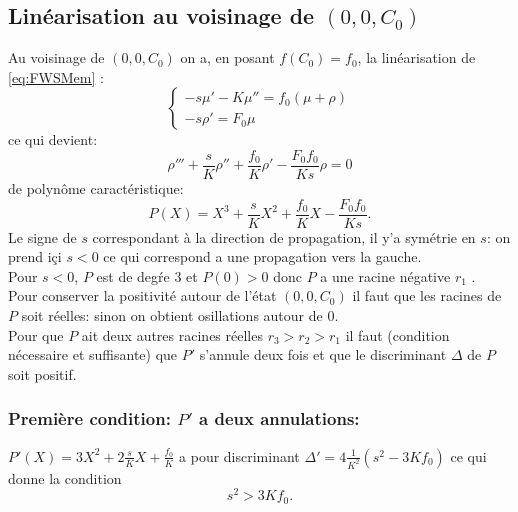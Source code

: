 \documentclass[11pt]{article}
\begin{document}
\subsection{Linéarisation au voisinage de $(0,0,C_0)$}
Au voisinage de $(0,0,C_0)$ on a, en posant $f(C_0)=f_0$, la linéarisation de \ref{eq:FWSMem} :
\begin{equation} \left\{ \begin{array}{ll} -s \mu'-K\mu''=f_0(\mu+\rho) \\ -s\rho' = F_0\mu   \end{array}\right.
\end{equation} ce qui devient:  \begin{equation} \rho''' +\frac{s}{K}\rho''+\frac{f_0}{K}\rho'-\frac{F_0f_0}{Ks}\rho =0 \end{equation} de polynôme caractéristique: \begin{equation} P(X)= X^3 +\frac{s}{K}X^2+\frac{f_0}{K}X-\frac{F_0f_0}{Ks}.\end{equation}
Le signe de $s$ correspondant à la direction de propagation, il y'a symétrie en $s$: on prend içi $s<0$ ce qui correspond a une propagation vers la gauche.\\
Pour $s<0$, $P$ est de degŕe 3 et $P(0)>0$ donc $P$ a une racine négative $r_1$ .\\
Pour conserver la positivité autour de l'état $(0,0,C_0)$ il faut que les racines de $P$ soit réelles: sinon on obtient osillations autour de 0.\\ 
Pour que $P$ ait deux autres racines réelles $r_3>r_2>r_1$ il faut (condition nécessaire et suffisante) que $P'$ s'annule deux fois et que le discriminant $\Delta$ de $P$ soit positif.
\subsubsection{Première condition: $P'$ a deux annulations:}
$P'(X)= 3X^2+ 2\frac{s}{K}X+ \frac{f_0}{K}$ a pour discriminant $\Delta'=4\frac{1}{K^2}(s^2-3Kf_0)$ ce qui donne la condition \begin{equation} \label{eq:condition_P'}
	\boxed{s^2 >3K f_0.
	}
\end{equation}
\end{document}
